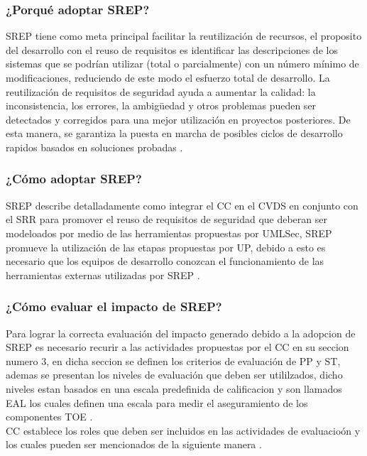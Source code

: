 \documentclass[runningheads,a4paper]{llncs}
\begin{document}
\subsubsection{¿Porqué adoptar \gls{SREP}?}

\gls{SREP} tiene como meta principal facilitar la reutilización de recursos, el proposito del desarrollo  con el reuso de requisitos es identificar las descripciones de los sistemas que se podrían utilizar (total o parcialmente) con un número mínimo de modificaciones, reduciendo de este modo el esfuerzo total de desarrollo. La reutilización de requisitos de seguridad ayuda a aumentar la calidad: la inconsistencia, los errores, la ambigüedad y otros problemas pueden ser detectados y corregidos para una mejor utilización en proyectos posteriores. De esta manera, se garantiza la puesta en marcha de posibles ciclos de desarrollo rapidos basados en soluciones probadas \cite{SREPMellado2}.

\subsubsection{¿Cómo adoptar \gls{SREP}?}
\gls{SREP} describe detalladamente como integrar el \gls{CC} en el \gls{CVDS} en conjunto con el \gls{SRR} para promover el reuso de requisitos de seguridad que deberan ser modeloados por medio de las herramientas propuestas por \gls{UMLSec}, \gls{SREP} promueve la utilización de las etapas propuestas por \gls{UP}, debido a esto es necesario que los equipos de desarrollo conozcan el funcionamiento de las herramientas externas utilizadas por \gls{SREP} \cite{SREPMellado2}. 

\subsubsection{¿Cómo evaluar el impacto de \gls{SREP}?}
Para lograr la correcta evaluación del impacto generado debido a la adopcion de \gls{SREP} es necesario recurir a las actividades propuestas por el \gls{CC} en su seccion numero 3, en dicha seccion se definen los criterios de evaluación de \gls{PP} y \gls{ST}, ademas se presentan los niveles de evaluación que deben ser utililzados, dicho niveles estan basados en una escala predefinida de calificacion y son llamados \gls{EAL} los cuales definen una escala para medir el aseguramiento de los componentes \gls{TOE} \cite{CCIntroduction}.\\

\gls{CC} establece los roles que deben ser incluidos en las actividades de evaluacioón y los cuales pueden ser mencionados de la siguiente manera \cite{CCIntroduction}.
\end{document}
